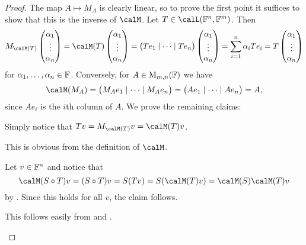 \begin{proof}
    The map $A \mapsto M_A$ is clearly linear, so to prove the first point it suffices to show that this is the inverse of $\calM$. Let $T \in \lin(\fieldF^n,\fieldF^m)$. Then
    \begin{equation*}
        M_{\smr{T}} \colvec{\alpha_1 \\ \vdots \\ \alpha_n}
            = \smr{T} \colvec{\alpha_1 \\ \vdots \\ \alpha_n}
            = \bigl( Te_1 \mid \cdots \mid Te_n \bigr) \colvec{\alpha_1 \\ \vdots \\ \alpha_n}
            = \sum_{i=1}^n \alpha_i Te_i
            = T \colvec{\alpha_1 \\ \vdots \\ \alpha_n}
    \end{equation*}
    for $\alpha_1, \ldots, \alpha_n \in \mathbb{F}$. Conversely, for $A \in \mathrm{M}_{m,n}(\mathbb{F})$ we have
    \begin{equation*}
        \smr{M_A}
            = \bigl( M_A e_1 \mid \cdots \mid M_A e_n \bigr)
            = \bigl( A e_1 \mid \cdots \mid A e_n \bigr)
            = A,
    \end{equation*}
    since $Ae_i$ is the $i$th column of $A$. We prove the remaining claims:
    \begin{proofsec}
        \item[\itemref{enum:smr-vector-multiplication}]
        Simply notice that $Tv = M_{\smr{T}}v = \smr{T}v$.

        \item[\itemref{enum:smr-of-identity-map}]
        This is obvious from the definition of $\calM$.

        \item[\itemref{enum:smr-multiplicative}]
        Let $v \in \mathbb{F}^n$ and notice that
        \begin{equation*}
            \smr{S \circ T}v
                = (S \circ T) v
                = S(Tv)
                = S(\smr{T}v)
                = \smr{S}\smr{T}v
        \end{equation*}
        by . Since this holds for all $v$, the claim follows.

        \item[\itemref{enum:smr-invertibility}]
        This follows easily from  and .
    \end{proofsec}
\end{proof}


